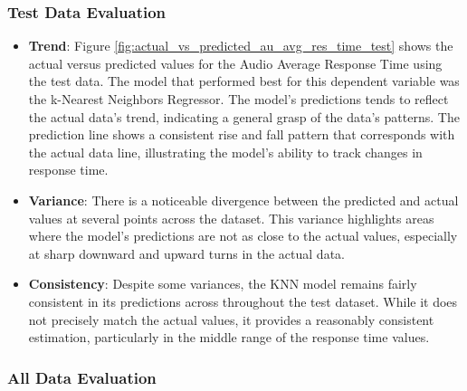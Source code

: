 \subsubsection*{Test Data Evaluation}

\begin{itemize}
    \item \textbf{Trend}: Figure \ref{fig:actual_vs_predicted_au_avg_res_time_test} shows the actual versus predicted values for the Audio Average Response Time using the test data. The model that performed
    best for this dependent variable was the k-Nearest Neighbors Regressor. The model's predictions tends to reflect the actual data's trend, indicating a general grasp of the data's patterns. The prediction line shows 
    a consistent rise and fall pattern that corresponds with the actual data line, illustrating the model's ability to track changes in response time.    
    
    \item \textbf{Variance}: There is a noticeable divergence between the predicted and actual values at several points across the dataset. This variance highlights areas where the model's predictions are not 
    as close to the actual values, especially at sharp downward and upward turns in the actual data.    
    
    \item \textbf{Consistency}: Despite some variances, the KNN model remains fairly consistent in its predictions across throughout the test dataset. While it does not precisely match the actual values, it provides 
    a reasonably consistent estimation, particularly in the middle range of the response time values.

\end{itemize}


\subsubsection*{All Data Evaluation}

